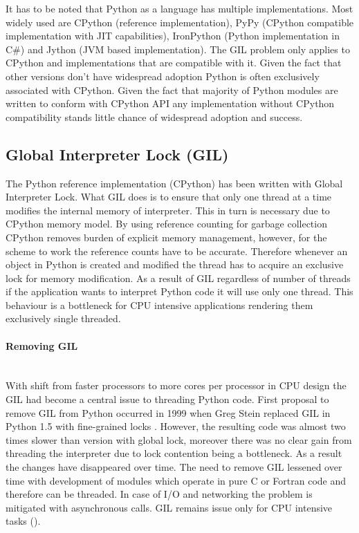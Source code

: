 \documentclass[12pt, a4paper]{report}
\newcommand{\myparagraph}[1]{\paragraph{#1}\mbox{}\\}
\begin{document}
It has to be noted that Python as a language has multiple implementations. Most
widely used are CPython (reference implementation), PyPy (CPython compatible implementation
with JIT capabilities), IronPython (Python implementation in C\#)
and Jython (JVM based implementation). The GIL problem only applies to CPython
and implementations that are compatible with it. Given the fact that other
versions don't have widespread adoption Python is often exclusively associated
with CPython. Given the fact that majority of Python modules are written to conform with
CPython API any implementation without CPython compatibility stands little chance
of widespread adoption and success.

\subsection{Global Interpreter Lock (GIL)}\label{subsec:GIL}
The Python reference implementation (CPython) has been written with Global
Interpreter Lock. What GIL does is to ensure that only one thread at a time
modifies the internal memory of interpreter. This in turn is necessary
due to CPython memory model. By using reference counting for garbage collection
CPython removes burden of explicit memory management, however, for the
scheme to work the reference counts have to be accurate. Therefore whenever
an object in Python is created and modified the thread has to acquire an
exclusive lock for memory modification. As a result of GIL regardless
of number of threads if the application wants to interpret Python code
it will use only one thread. This behaviour is a bottleneck for CPU
intensive applications rendering them exclusively single threaded.

\myparagraph{Removing GIL}\label{para:remove-gil}
With shift from faster processors to more cores per processor in CPU
design the GIL had become a central issue to threading Python code.
First proposal to remove GIL from Python occurred in 1999 when Greg Stein
replaced GIL in Python 1.5 with fine-grained locks \cite{Guido:GIL}. However, the resulting
code was almost two times slower than version with global lock,
moreover there was no clear gain from threading the interpreter due
to lock contention being a bottleneck. As a result the changes have
disappeared over time. The need to remove GIL lessened over time
with development of modules which operate in pure C or Fortran code
and therefore can be threaded. In case of I/O and networking the
problem is mitigated with asynchronous calls. GIL remains issue
only for CPU intensive tasks (\cite{UnderstandingGIL}).
\end{document}
